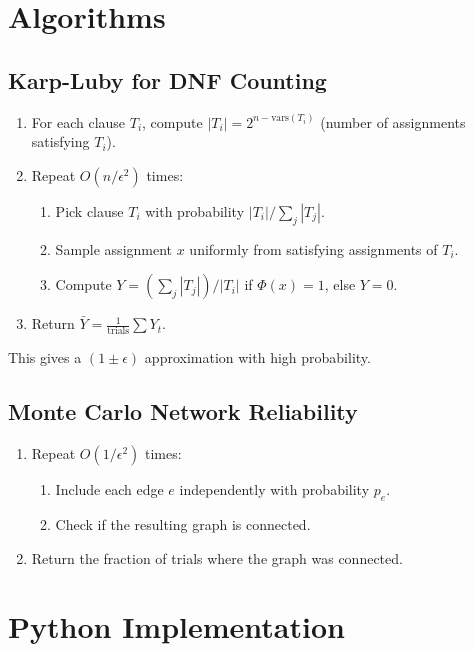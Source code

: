 \section{Algorithms}

\subsection{Karp-Luby for DNF Counting~\cite{karp-luby83}}
\begin{enumerate}
    \item For each clause $T_i$, compute $|T_i| = 2^{n - \text{vars}(T_i)}$ (number of assignments satisfying $T_i$).
    \item Repeat $O(n/\epsilon^2)$ times:
    \begin{enumerate}
        \item Pick clause $T_i$ with probability $|T_i| / \sum_j |T_j|$.
        \item Sample assignment $x$ uniformly from satisfying assignments of $T_i$.
        \item Compute $Y = (\sum_j |T_j|) / |T_i|$ if $\Phi(x) = 1$, else $Y = 0$.
    \end{enumerate}
    \item Return $\bar{Y} = \frac{1}{\text{trials}} \sum Y_t$.
\end{enumerate}
This gives a $(1 \pm \epsilon)$ approximation with high probability.

\subsection{Monte Carlo Network Reliability}
\begin{enumerate}
    \item Repeat $O(1/\epsilon^2)$ times:
    \begin{enumerate}
        \item Include each edge $e$ independently with probability $p_e$.
        \item Check if the resulting graph is connected.
    \end{enumerate}
    \item Return the fraction of trials where the graph was connected.
\end{enumerate}

\section{Python Implementation}

